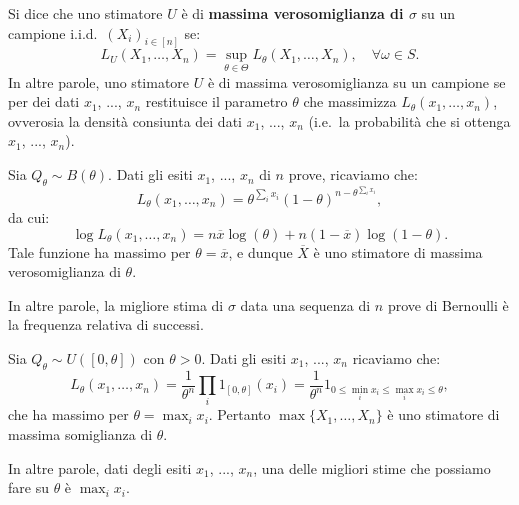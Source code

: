 \begin{multicols*}{2}
\begin{definition}
    Si dice che uno stimatore $U$ è di \textbf{massima verosomiglianza di $\sigma$}
    su un campione i.i.d.~$(X_i)_{i \in [n]}$ se:
    \[
        L_U(X_1, \ldots, X_n) = \sup_{\theta \in \Theta} L_\theta(X_1, \ldots, X_n), \quad \forall \omega \in S.
    \]
    In altre parole, uno stimatore $U$ è di massima verosomiglianza su un campione se
    per dei dati $x_1$, ..., $x_n$ restituisce il parametro $\theta$ che massimizza
    $L_\theta(x_1, \ldots, x_n)$, ovverosia la densità consiunta dei dati
    $x_1$, ..., $x_n$ (i.e.~la probabilità che si ottenga $x_1$, ..., $x_n$).
\end{definition}

\begin{example}
    Sia $Q_\theta \sim B(\theta)$. Dati gli esiti $x_1$, ..., $x_n$ di $n$ prove,
    ricaviamo che:
    \[
        L_\theta(x_1, \ldots, x_n) = \theta^{\sum_i x_i} (1 - \theta)^{n - \theta^{\sum_i x_i}},
    \]
    da cui:
    \[
        \log L_\theta(x_1, \ldots, x_n) = n \overline{x} \log(\theta) + n (1 - \overline{x}) \log(1 - \theta).
    \]
    Tale funzione ha massimo per $\theta = \overline{x}$, e dunque
    $\overline{X}$ è uno stimatore di massima verosomiglianza di $\theta$. \smallskip

    In altre parole, la migliore stima di $\sigma$ data una sequenza di $n$ prove di Bernoulli è
    la frequenza relativa di successi.
\end{example}

\begin{example}
    Sia $Q_\theta \sim U([0, \theta])$ con $\theta > 0$. Dati gli esiti $x_1$, ..., $x_n$ ricaviamo che:
    \[
        L_\theta(x_1, \ldots, x_n) = \frac{1}{\theta^n} \prod_i 1_{[0, \theta]}(x_i) =
        \frac{1}{\theta^n} 1_{0 \leq \min_i x_i \leq \max_i x_i \leq \theta},
    \]
    che ha massimo per $\theta = \max_i x_i$. Pertanto $\max\{X_1, \ldots, X_n\}$ è uno stimatore
    di massima somiglianza di $\theta$. \smallskip

    In altre parole, dati degli esiti $x_1$, ..., $x_n$, una delle migliori stime che possiamo fare
    su $\theta$ è $\max_i x_i$.
\end{example}

\end{multicols*}

